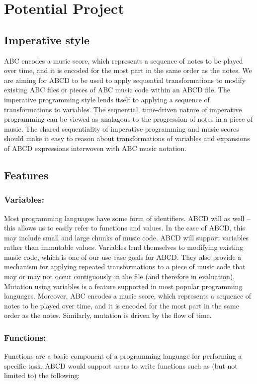 \section{Potential Project}

\subsection{Imperative style}
    ABC encodes a music score, which represents a sequence of notes to be played over time, and it is encoded for the most part in the same order as the notes. We are aiming for ABCD to be used to apply sequential transformations to modify existing ABC files or pieces of ABC music code within an ABCD file. The imperative programming style lends itself to applying a sequence of transformations to variables. The sequential, time-driven nature of imperative programming can be viewed as analagous to the progression of notes in a piece of music. The shared sequentiality of imperative programming and music scores should make it easy to reason about transformations of variables and expansions of ABCD expressions interwoven with ABC music notation.

\subsection{Features}
    \subsubsection{Variables:}
    Most programming languages have some form of identifiers. ABCD will as well -- this allows us to easily refer to functions and values. In the case of ABCD, this may include small and large chunks of music code. ABCD will support variables rather than immutable values. Variables lend themselves to modifying existing music code, which is one of our use case goals for ABCD. They also provide a mechanism for applying repeated transformations to a piece of music code that may or may not occur contiguously in the file (and therefore in evaluation). Mutation using variables is a feature supported in most popular programming languages. Moreover, ABC encodes a music score, which represents a sequence of notes to be played over time, and it is encoded for the most part in the same order as the notes. Similarly, mutation is driven by the flow of time. 
    
    \subsubsection{Functions:}
    Functions are a basic component of a programming language for performing a specific task. ABCD would support users to write functions such as (but not limited to) the following:

